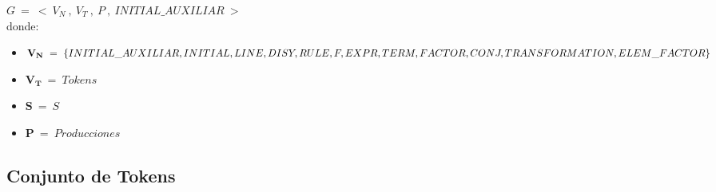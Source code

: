 $G\ =\ <\ V_N\ ,\ V_T\ ,\ P\ ,\ INITIAL\_AUXILIAR\ >$\\

donde:\\
\begin{itemize}

\item []$\mathbf{V_N}\ =\ \{ INITIAL\_AUXILIAR, INITIAL, LINE, DISY, RULE, F, EXPR, TERM, FACTOR, \\
CONJ, TRANSFORMATION, ELEM\_FACTOR \}$

\item []$\mathbf{V_T}\ =\ Tokens$
\item []$\mathbf{S}\ =\ S$
\item []$\mathbf{P}\ =\ Producciones$
\end{itemize}
\subsection{Conjunto de Tokens}

